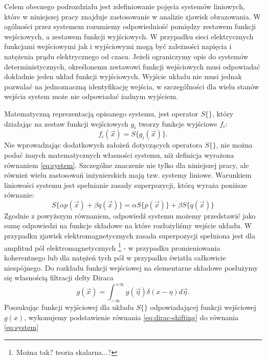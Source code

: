 Celem obecnego podrozdziału jest zdefiniowanie pojęcia systemów liniowych, które w niniejszej pracy znajduje zastosowanie w analizie zjawisk obrazowania. W ogólności przez systemem rozumiemy odpowiedniość pomiędzy zestawem funkcji wejściowych, a zestawem funkcji wyjściowych. W przypadku sieci elektrycznych funkcjami wejściowymi jak i wyjściowymi mogą być zależności napięcia i natężenia prądu elektrycznego od czasu. Jeżeli ograniczymy opis do systemów deterministycznych, określonemu zestawowi funkcji wejściowych musi odpowiadać dokładnie jeden układ funkcji wyjściowych. Wyjście układu nie musi jednak pozwalać na jednoznaczną identyfikację wejścia, w szczególności dla wielu stanów wejścia system może nie odpowiadać żadnym wyjściem.

\label{art:lsi}

Matematyczną reprezentacją opisanego systemu, jest operator $S\{\}$, który działając na zestaw funkcji wejściowych $g_i$ tworzy funkcje wyjściowe $f_i$:
\begin{equation}
f_i(\vec{x})=S\{g_i(\vec{x})\}.
\label{eq:system}
\end{equation} 
Nie wprowadzając dodatkowych założeń dotyczących operatora $S\{\}$, nie można podać innych matematycznych własności systemu, niż definicja wyrażona równaniem \ref{eq:system}. Szczególne znaczenie nie tylko dla niniejszej pracy, ale również wielu zastosowań inżynierskich mają tzw. systemy liniowe. Warunkiem liniowości systemu jest spełnianie zasady superpozycji, którą wyraża poniższe równanie:
\begin{equation}
S\{\alpha p(\vec{x}) + \beta q(\vec{x})\} = \alpha S\{p(\vec{x})\} + \beta S\{q(\vec{x})\}
\label{eq:lin-system}
\end{equation}
Zgodnie z powyższym równaniem, odpowiedź systemu możemy przedstawić jako sumę odpowiedzi na funkcje składowe na które rozłożyliśmy wejście układu. W przypadku zjawisk elektromagnetycznych zasada superpozycji spełniona jest dla amplitud pól elektromagnetycznych \footnote{Można tak? teoria skalarna...?} - w przypadku promieniowania koherentnego lub dla natężeń tych pół w przypadku światła całkowicie niespójnego.  Do rozkładu funkcji wejściowej na elementarne składowe posłużymy się własnością filtracji delty Diraca
\begin{equation}
g(\vec{x})=\int_{-\infty}^{+\infty} g(\vec{\eta}) \delta(x-\eta) d \vec{\eta}.
\label{eq:dirac-shifting}
\end{equation}
Poszukując funkcji wyjściowej dla układu $S\{\}$ odpowiadającej funkcji wejściowej $g(x)$, wykonujemy podstawienie równania \ref{eq:dirac-shifting} do równania \ref{eq:system} 
